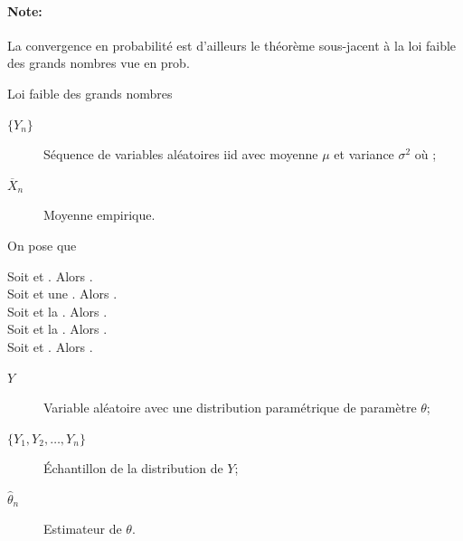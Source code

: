\documentclass[10pt, french]{article}
\begin{document}
\begin{multicols*}{2}
\paragraph{Note:}	La convergence en probabilité est d'ailleurs le théorème sous-jacent à la loi faible des grands nombres vue en prob.

\begin{rappel}{Loi faible des grands nombres}
\begin{distributions}[Notation]
\begin{description}
	\item[$\{Y_{n}\}$]	Séquence de variables aléatoires iid avec moyenne $\mu$ et variance $\sigma^{2}$ où ;
	\item[$\overline{X}_{n}$]	Moyenne empirique.
\end{description}
\end{distributions}

On pose que 
\end{rappel}

\begin{definitionNOHFILLsub}
Soit  et . Alors .\\
Soit  et une . Alors .\\
Soit  et la . Alors .\\
Soit  et la . Alors .\\
Soit  et . Alors .
\end{definitionNOHFILLsub}

\begin{definitionNOHFILL}
\begin{distributions}[Notation]
\begin{description}
	\item[$Y$]	Variable aléatoire avec une distribution paramétrique de paramètre $\theta$;
	\item[$\{Y_{1}, Y_{2}, \dots, Y_{n}\}$]	Échantillon de la distribution de $Y$;
	\item[$\hat{\theta}_{n}$]	Estimateur de $\theta$.
\end{description}
\end{distributions}


\end{definitionNOHFILL}
\end{multicols*}
\end{document}
